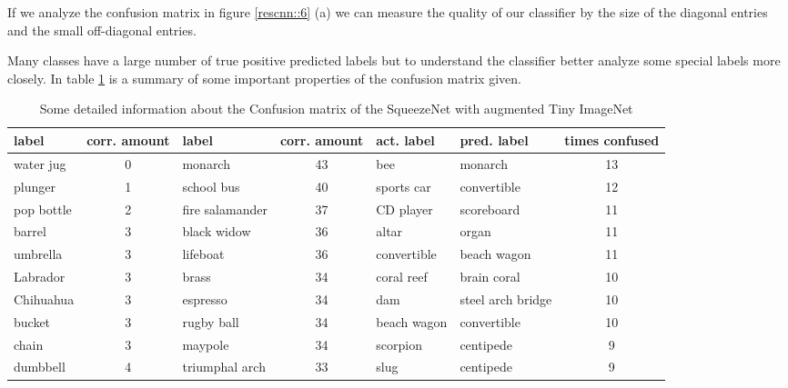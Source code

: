 \documentclass[11pt]{article}
\begin{document}
If we analyze the confusion matrix in figure \ref{rescnn::6} (a) we can measure the quality of our classifier by the size of the diagonal entries and the small off-diagonal entries.

Many classes have a large number of true positive predicted labels but to understand the classifier better analyze some special labels more closely. In table \ref{rescnn::7} is a summary of some important properties of the confusion matrix given.

\begin{table}[h]
\begin{tabular}{lc|lc|llc}
\toprule
             label &  corr. amount &                    label &  corr. amount & act. label &   pred. label &  times confused \\
\midrule
         water jug &               0 &                  monarch &              43 &          bee &           monarch &              13 \\
           plunger &               1 &               school bus &              40 &   sports car &       convertible &              12 \\
        pop bottle &               2 & fire salamander &              37 &    CD player &        scoreboard &              11 \\
            barrel &               3 &              black widow &              36 &        altar &             organ &              11 \\
          umbrella &               3 &                 lifeboat &              36 &  convertible &       beach wagon &              11 \\
Labrador  &               3 &                    brass &              34 &   coral reef &       brain coral &              10 \\
         Chihuahua &               3 &                 espresso &              34 &          dam & steel arch bridge &              10 \\
            bucket &               3 &               rugby ball &              34 &  beach wagon &       convertible &              10 \\
             chain &               3 &                  maypole &              34 &     scorpion &         centipede &               9 \\
          dumbbell &               4 &           triumphal arch &              33 &         slug &         centipede &               9 \\
\bottomrule
\end{tabular}
\caption{Some detailed information about the Confusion matrix of the SqueezeNet with augmented Tiny ImageNet }
\label{rescnn::7}
\end{table}
\end{document}
